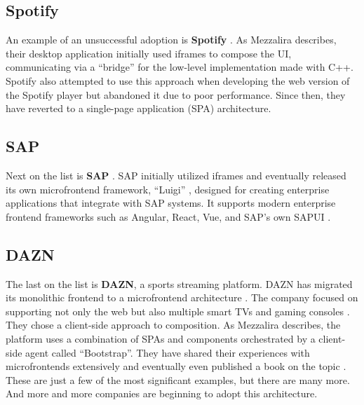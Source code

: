 \subsection{Spotify}
An example of an unsuccessful adoption is \textbf{Spotify} \cite{Spotify}. As Mezzalira \cite{MezzaliraBuildingMf} describes, their desktop application initially used iframes to compose the UI, communicating via a ``bridge'' for the low-level implementation made with C++. Spotify also attempted to use this approach when developing the web version of the Spotify player but abandoned it due to poor performance. Since then, they have reverted to a single-page application (SPA) architecture.\\

\subsection{SAP}
Next on the list is \textbf{SAP} \cite{SAP}. SAP initially utilized iframes and eventually released its own microfrontend framework, ``Luigi'' \cite{Luigi}, designed for creating enterprise applications that integrate with SAP systems. It supports modern enterprise frontend frameworks such as Angular, React, Vue, and SAP's own SAPUI \cite{MezzaliraBuildingMf}. \\

\subsection{DAZN}
The last on the list is \textbf{DAZN}, a sports streaming platform. DAZN has migrated its monolithic frontend to a microfrontend architecture \cite{Geers}. The company focused on supporting not only the web but also multiple smart TVs and gaming consoles \cite{MezzaliraBuildingMf}. They chose a client-side approach to composition. As Mezzalira \cite{MezzaliraBuildingMf} describes, the platform uses a combination of SPAs and components orchestrated by a client-side agent called ``Bootstrap''. They have shared their experiences with microfrontends extensively and eventually even published a book on the topic \cite{MezzaliraBuildingMf}. \\

\noindent
These are just a few of the most significant examples, but there are many more. And more and more companies are beginning to adopt this architecture.